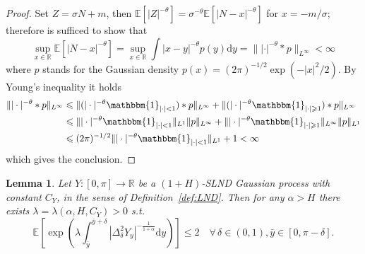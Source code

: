 \documentclass[11pt,oneside,reqno]{amsart}
\newcommand{\mathd}{\mathrm{d}}
\newtheorem{lemma}[theorem]{Lemma}
\numberwithin{equation}{section}
\begin{document}
\begin{proof}
  Set $Z = \sigma N + m$, then $\mathbb{E} [| Z |^{- \theta}] = \sigma^{-
  \theta} \mathbb{E} [| N - x |^{- \theta}]$ for $x = - m / \sigma$; therefore
  is sufficed to show that
  \[ \sup_{x \in \mathbb{R}} \mathbb{E} [| N - x |^{- \theta} ] = \sup_{x \in
     \mathbb{R}} \int | x - y |^{- \theta} p (y) \mathd y = \| | \cdot |^{-
     \theta} \ast p \|_{L^{\infty}} < \infty \]
  where $p$ stands for the Gaussian density $p (x) = (2 \pi)^{- 1 / 2} \exp (-
  | x |^2 / 2)$. By Young's inequality it holds
%  
  \begin{align*}
    \| | \cdot |^{- \theta} \ast p \|_{L^{\infty}} & \leqslant \| (| \cdot
    |^{- \theta} \mathbbm{1}_{| \cdot | < 1}) \ast p \|_{L^{\infty}} + \| (|
    \cdot |^{- \theta} \mathbbm{1}_{| \cdot | \geqslant 1}) \ast p
    \|_{L^{\infty}}\\
    & \leqslant \| | \cdot |^{- \theta} \mathbbm{1}_{| \cdot | < 1} \|_{L^1}
    \| p \|_{L^{\infty}} + \| | \cdot |^{- \theta} \mathbbm{1}_{| \cdot |
    \geqslant 1} \|_{L^{\infty}}  \| p \|_{L^1}\\
    & \leqslant (2 \pi)^{- 1 / 2} \| | \cdot |^{- \theta} \mathbbm{1}_{|
    \cdot | < 1} \|_{L^1} + 1 < \infty
  \end{align*}
%  
  which gives the conclusion.
\end{proof}

\begin{lemma}
  \label{lem:gauss-lemma3}Let $Y : [0, \pi] \rightarrow \mathbb{R}$ be a $(1 +
  H)$-SLND Gaussian process with constant $C_Y$, in the sense of
  Definition~\ref{def:LND}. Then for any $\alpha > H$ there exists $\lambda =
  \lambda (\alpha, H, C_Y) > 0$ s.t.
  \[ \mathbb{E} \left[ \exp \left( \lambda \int_{\bar{y}}^{\bar{y} + \delta} |
     \Delta^2_{\delta} Y_y |^{- \frac{1}{1 + \alpha}} \mathd y \right) \right]
     \leqslant 2 \quad \forall \, \delta \in (0, 1), \bar{y} \in [0, \pi -
     \delta] . \]
\end{lemma}
\end{document}
